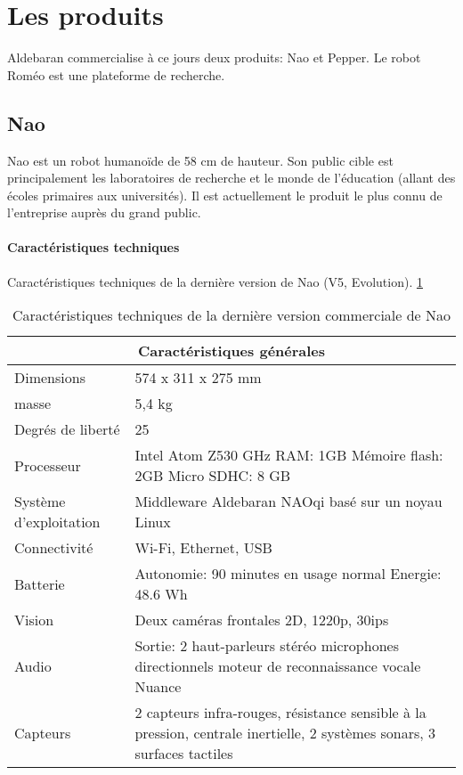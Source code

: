 \section{Les produits}
\label{Entreprise: Les produits}
Aldebaran commercialise à ce jours deux produits: Nao et Pepper. Le robot Roméo est une plateforme de recherche. 

\subsection{Nao}
\label{Entreprise: Les produits: Nao}
Nao est un robot humanoïde de 58 cm de hauteur. Son public cible est principalement les laboratoires de recherche et le monde de l'éducation (allant des écoles primaires aux universités). Il est actuellement le produit le plus connu de l'entreprise auprès du grand public. 

\paragraph{Caractéristiques techniques}
\label{Entreprise:Les produits: Nao: Caractéristiques techniques}
Caractéristiques techniques de la dernière version de Nao (V5, Evolution). \ref{tab: Caractéristiques technique de Nao}

\begin{table}[h]
\begin{tabular}{ | l | p{8cm} | }
\hline
\multicolumn{2}{|c|}{Caractéristiques générales} \\
\hline
Dimensions & 574 x 311 x 275 mm \\
\hline 
masse & 5,4 kg \\
\hline 
Degrés de liberté  & 25 \\
\hline
Processeur & Intel Atom Z530 \newline 1.6 GHz \newline RAM: 1GB \newline Mémoire flash: 2GB  \newline Micro SDHC: 8 GB \\
\hline
Système d'exploitation & Middleware Aldebaran NAOqi basé sur un noyau Linux \\
\hline
Connectivité & Wi-Fi, Ethernet, USB \\
\hline
Batterie & Autonomie: 90 minutes en usage normal \newline Energie: 48.6 Wh \\
\hline 
Vision & Deux caméras frontales 2D, 1220p, 30ips \\
\hline
Audio & Sortie: 2 haut-parleurs stéréo \newline 4 microphones directionnels \newline moteur de reconnaissance vocale Nuance  \\
\hline
Capteurs & 2 capteurs infra-rouges, résistance sensible à la pression, centrale inertielle, 2 systèmes sonars, 3 surfaces tactiles \\
\hline
\end{tabular}
\caption[Caractéristiques technique de Nao]{Caractéristiques techniques de la dernière version commerciale  de Nao}
\label {tab: Caractéristiques technique de Nao}
\end{table}


